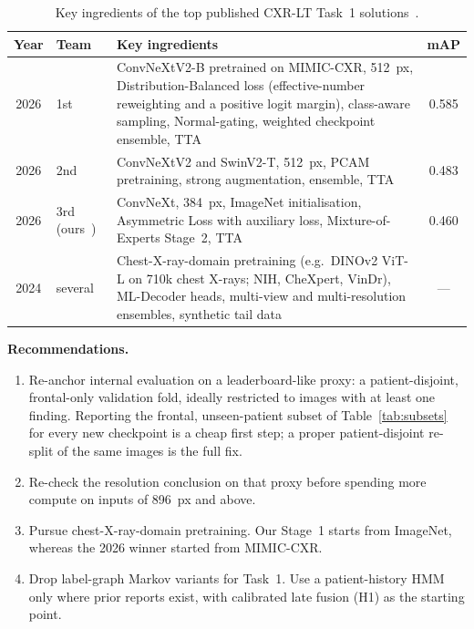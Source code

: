 \documentclass[conference]{IEEEtran}
\begin{document}
\begin{table}[htbp]
\caption{Key ingredients of the top published CXR-LT Task~1 solutions~\cite{b14,b15,b16}.}
\begin{center}
\begin{tabular}{|c|l|p{10.2cm}|c|}
\hline
\textbf{Year} & \textbf{Team} & \textbf{Key ingredients} & \textbf{mAP} \\
\hline
2026 & 1st~\cite{b15} & ConvNeXtV2-B pretrained on MIMIC-CXR, 512~px, Distribution-Balanced loss (effective-number reweighting and a positive logit margin), class-aware sampling, Normal-gating, weighted checkpoint ensemble, TTA & 0.585 \\
\hline
2026 & 2nd & ConvNeXtV2 and SwinV2-T, 512~px, PCAM pretraining, strong augmentation, ensemble, TTA & 0.483 \\
\hline
2026 & 3rd (ours~\cite{b12}) & ConvNeXt, 384~px, ImageNet initialisation, Asymmetric Loss with auxiliary loss, Mixture-of-Experts Stage~2, TTA & 0.460 \\
\hline
2024 & several~\cite{b16} & Chest-X-ray-domain pretraining (e.g.\ DINOv2 ViT-L on 710k chest X-rays; NIH, CheXpert, VinDr), ML-Decoder heads, multi-view and multi-resolution ensembles, synthetic tail data & --- \\
\hline
\end{tabular}
\label{tab:winners}
\end{center}
\end{table}

\textbf{Recommendations.}
\begin{enumerate}
\item Re-anchor internal evaluation on a leaderboard-like proxy: a patient-disjoint, frontal-only validation fold, ideally restricted to images with at least one finding. Reporting the frontal, unseen-patient subset of Table~\ref{tab:subsets} for every new checkpoint is a cheap first step; a proper patient-disjoint re-split of the same images is the full fix.
\item Re-check the resolution conclusion on that proxy before spending more compute on inputs of 896~px and above.
\item Pursue chest-X-ray-domain pretraining. Our Stage~1 starts from ImageNet, whereas the 2026 winner started from MIMIC-CXR.
\item Drop label-graph Markov variants for Task~1. Use a patient-history HMM only where prior reports exist, with calibrated late fusion (H1) as the starting point.
\end{enumerate}
\end{document}
